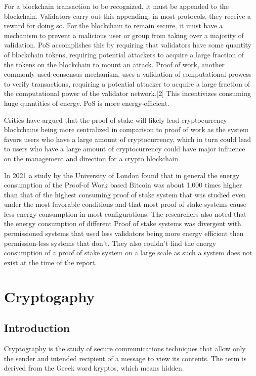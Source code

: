 \documentclass[BTech]{srmuthesis}
\begin{document}
 For a blockchain transaction to be recognized, it must be appended to the blockchain. Validators carry out this appending; in most protocols, they receive a reward for doing so. For the blockchain to remain secure, it must have a mechanism to prevent a malicious user or group from taking over a majority of validation. PoS accomplishes this by requiring that validators have some quantity of blockchain tokens, requiring potential attackers to acquire a large fraction of the tokens on the blockchain to mount an attack.
 Proof of work, another commonly used consensus mechanism, uses a validation of computational prowess to verify transactions, requiring a potential attacker to acquire a large fraction of the computational power of the validator network.[2] This incentivizes consuming huge quantities of energy. PoS is more energy-efficient.

 Critics have argued that the proof of stake will likely lead cryptocurrency blockchains being more centralized in comparison to proof of work as the system favors users who have a large amount of cryptocurrency, which in turn could lead to users who have a large amount of cryptocurrency could have major influence on the management and direction for a crypto blockchain.

 In 2021 a study by the University of London \citet{9741872} found that in general the energy consumption of the Proof-of Work based Bitcoin was about 1,000 times higher than that of the highest consuming proof of stake system that was studied even under the most favorable conditions and that most proof of stake systems cause less energy consumption in most configurations. The researchers also noted that the energy consumption of different Proof of stake systems was divergent with permissioned systems that used less validators being more energy efficient then permission-less systems that don't. They also couldn't find the energy consumption of a proof of stake system on a large scale as such a system does not exist at the time of the report.

 \chapter{Cryptogaphy}
 \section{Introduction}
 Cryptography is the study of secure communications techniques that allow only the sender and intended recipient of a message to view its contents. The term is derived from the Greek word kryptos, which means hidden.
\end{document}
